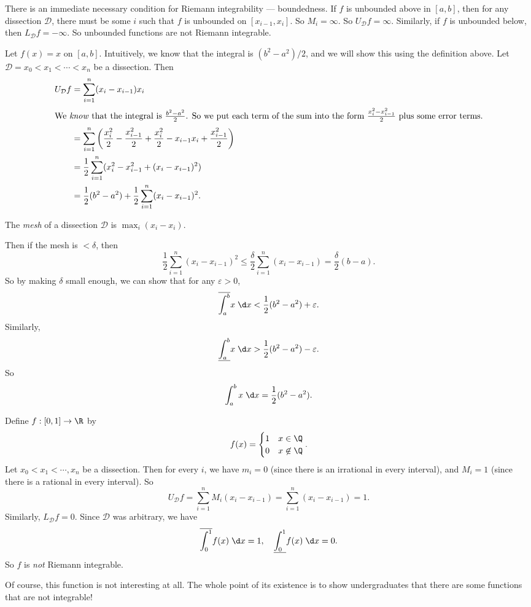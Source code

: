 \documentclass[a4paper]{article}
\begin{document}
There is an immediate necessary condition for Riemann integrability --- boundedness. If $f$ is unbounded above in $[a, b]$, then for any dissection $\mathcal{D}$, there must be some $i$ such that $f$ is unbounded on $[x_{i - 1}, x_i]$. So $M_i = \infty$. So $U_\mathcal{D} f = \infty$. Similarly, if $f$ is unbounded below, then $L_{\mathcal{D}} f = -\infty$. So unbounded functions are not Riemann integrable.

\begin{eg}
  Let $f(x) = x$ on $[a, b]$. Intuitively, we know that the integral is $(b^2 - a^2)/2$, and we will show this using the definition above. Let $\mathcal{D} = x_0 < x_1 < \cdots < x_n$ be a dissection. Then
  \begin{align*}
    U_{\mathcal{D}}f &= \sum_{i = 1}^n (x_i - x_{i - 1})x_i\\
    \intertext{We \emph{know} that the integral is $\frac{b^2 - a^2}{2}$. So we put each term of the sum into the form $\frac{x_i^2 - x_{i - 1}^2}{2}$ plus some error terms.}
    &= \sum_{i = 1}^n \left(\frac{x_i^2}{2} - \frac{x_{i - 1}^2}{2} + \frac{x_i^2}{2} - x_{i - 1}x_i + \frac{x_{i - 1}^2}{2}\right)\\
    &= \frac{1}{2}\sum_{i = 1}^n (x_i^2 - x_{i - 1}^2 + (x_i - x_{i - 1})^2)\\
    &= \frac{1}{2}(b^2 - a^2) + \frac{1}{2}\sum_{i = 1}^n(x_i - x_{i - 1})^2.
  \end{align*}
  \begin{defi}[Mesh]
    The \emph{mesh} of a dissection $\mathcal{D}$ is $\max_i (x_i - x_i)$.
  \end{defi}
  Then if the mesh is $ < \delta$, then
    \[
      \frac{1}{2}\sum_{i = 1}^n (x_i - x_{i - 1})^2 \leq \frac{\delta}{2}\sum_{i = 1}^n (x_i - x_{i - 1}) = \frac{\delta}{2}(b - a).
    \]
  So by making $\delta$ small enough, we can show that for any $\varepsilon > 0$,
  \[
    \overline{\int_a^b} x\;\d x < \frac{1}{2}(b^2 - a^2) + \varepsilon.
  \]
  Similarly,
  \[
    \underline{\int_a^b} x\;\d x > \frac{1}{2}(b^2 - a^2) - \varepsilon.
  \]
  So
  \[
    \int_a^b x\;\d x = \frac{1}{2}(b^2 - a^2).
  \]
\end{eg}

\begin{eg}
  Define $f: [0, 1] \to \R$ by
  \[
    f(x) =
    \begin{cases}
      1 & x \in \Q\\
      0 & x \not\in \Q
    \end{cases}.
  \]
  Let $x_0 < x_1 < \cdots, x_n$ be a dissection. Then for every $i$, we have $m_i = 0$ (since there is an irrational in every interval), and $M_i = 1$ (since there is a rational in every interval). So
  \[
    U_{\mathcal{D}}f = \sum_{i = 1}^nM_i(x_i - x_{i - 1}) = \sum_{i = 1}^n (x_i - x_{i - 1}) = 1.
  \]
  Similarly, $L_\mathcal{D} f = 0$. Since $\mathcal{D}$ was arbitrary, we have
  \[
    \overline{\int_0^1}f(x)\;\d x = 1, \quad \underline{\int_0^1}f(x)\;\d x = 0.
  \]
  So $f$ is \emph{not} Riemann integrable.

  Of course, this function is not interesting at all. The whole point of its existence is to show undergraduates that there are some functions that are not integrable!
\end{eg}
\end{document}
